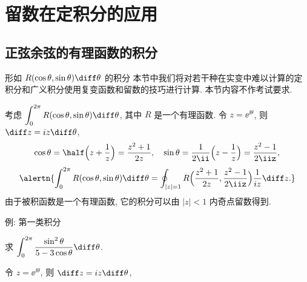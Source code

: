 \section{留数在定积分的应用}

\subsection{正弦余弦的有理函数的积分}

\begin{frame}{形如 $R(\cos\theta,\sin\theta)\diff\theta$ 的积分\noexer}
	\onslide<+->
	本节中我们将对若干种在实变中难以计算的定积分和广义积分使用复变函数和留数的技巧进行计算.
	\onslide<+->
	本节内容不作考试要求.

	\onslide<+->
	考虑 $\displaystyle\int_0^{2\pi} R(\cos\theta,\sin\theta)\diff\theta$, 其中 $R$ 是一个有理函数.
	\onslide<+->
	令 $z=\ee^{\ii\theta}$, 则 $\diff z=iz\diff\theta$,
	\onslide<+->
	\[\cos\theta=\half\Bigl(z+\frac1z\Bigr)=\frac{z^2+1}{2z},\quad
	\sin\theta=\frac1{2\ii}\Bigl(z-\frac1z\Bigr)=\frac{z^2-1}{2\iiz},
	\]
	\onslide<+->
	\[\alertn{\int_0^{2\pi} R(\cos\theta,\sin\theta)\diff\theta=\oint_{|z|=1}R\Bigl(\frac{z^2+1}{2z},\frac{z^2-1}{2\iiz}\Bigr)\frac1{iz}\diff z.}
	\]
	\onslide<+->
	由于被积函数是一个有理函数, 它的积分可以由 $|z|<1$ 内奇点留数得到.
\end{frame}


\begin{frame}{例: 第一类积分\noexer}\small
	\beqskip{1pt}
	\onslide<+->
	\begin{example}
		求 $\displaystyle\int_0^{2\pi}\frac{\sin^2\theta}{5-3\cos\theta}\diff\theta$.
	\end{example}

	\onslide<+->
	\begin{solution}
		令 $z=\ee^{\ii\theta}$, 则 $\diff z=iz\diff\theta$,
		\onslide<+->{
			\[\cos\theta=\half\Bigl(z+\frac1z\Bigr)=\frac{z^2+1}{2z},\qquad
			\sin\theta=\frac1{2\ii}\Bigl(z-\frac1z\Bigr)=\frac{z^2-1}{2\iiz},
	\]
		}\onslide<+->{
			\[
				\int_0^{2\pi}\frac{\sin^2\theta}{5-3\cos\theta}\diff\theta
				=\oint_{|z|=1}\frac{(z^2-1)^2}{-4z^2}\cdot\frac1{5-3\dfrac{z^2+1}{2z}}\cdot\frac{\diff z}{iz}
				=-\frac i6\oint_{|z|=1}\frac{(z^2-1)^2}{z^2(z-3)(z-\dfrac13)}\diff z.
	\]
		}\onslide<+->{%
			则
			$\Res[f(z),0]=\dfrac{10}3, \Res[f(z),\dfrac13]=-\dfrac83$,
		}
		\onslide<+->{
			\[
				\int_0^{2\pi}\frac{\sin^2\theta}{5-3\cos\theta}\diff\theta
				=-\frac i6\cdot 2\pi\ii\Bigl[\Res[f(z),0]+\Res[f(z),\frac13]\Bigr]
				=\frac{2\pi}9.
	\]
		}
		\vspace{-.5\baselineskip}
	\end{solution}
	\endgroup
\end{frame}

